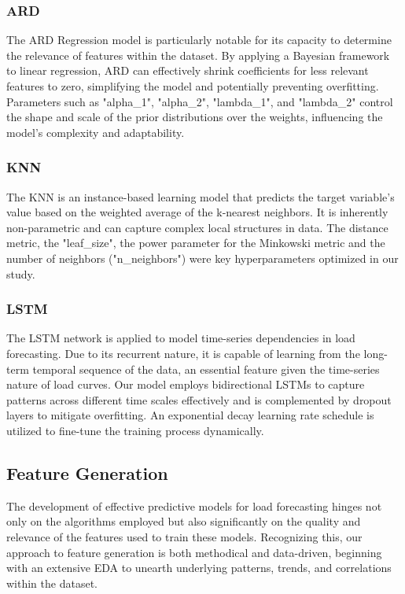 \documentclass{article} %
\begin{document}
\subsubsection{ARD}
The \gls{ARD} Regression model is particularly notable for its capacity to determine the relevance of features within the dataset. By applying a Bayesian framework to linear regression, \gls{ARD} can effectively shrink coefficients for less relevant features to zero, simplifying the model and potentially preventing overfitting. Parameters such as "alpha\_1", "alpha\_2", "lambda\_1", and "lambda\_2" control the shape and scale of the prior distributions over the weights, influencing the model's complexity and adaptability. 


\subsubsection{KNN}
The \gls{KNN} is an instance-based learning model that predicts the target variable's value based on the weighted average of the k-nearest neighbors. It is inherently non-parametric and can capture complex local structures in data. The distance metric, the "leaf\_size", the power parameter for the Minkowski metric and the number of neighbors ("n\_neighbors") were key hyperparameters optimized in our study.  

\subsubsection{LSTM}
The \gls{LSTM} network is applied to model time-series dependencies in load forecasting. Due to its recurrent nature, it is capable of learning from the long-term temporal sequence of the data, an essential feature given the time-series nature of load curves. Our model employs bidirectional LSTMs to capture patterns across different time scales effectively and is complemented by dropout layers to mitigate overfitting. An exponential decay learning rate schedule is utilized to fine-tune the training process dynamically. 

\subsection{Feature Generation}
\label{subCha.:FeatureGeneration}
The development of effective predictive models for load forecasting hinges not only on the algorithms employed but also significantly on the quality and relevance of the features used to train these models. Recognizing this, our approach to feature generation is both methodical and data-driven, beginning with an extensive \gls{EDA} to unearth underlying patterns, trends, and correlations within the dataset. 
\end{document}
